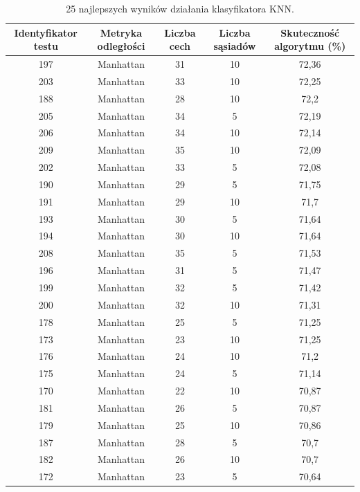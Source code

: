 \documentclass{article}
\begin{document}
\begin{center}
	\begin{longtable}{ |c|c|c|c|c| }
		\caption{25 najlepszych wyników działania klasyfikatora KNN.}
		\label{tab:srednie_wyniki}\\
		\hline
			Identyfikator testu & Metryka odległości & Liczba cech & Liczba sąsiadów & Skuteczność algorytmu (\%) \\
		\hline
            197 & Manhattan & 31 & 10 & 72,36\\
            203	& Manhattan & 33 & 10 & 72,25\\
            188	& Manhattan & 28 & 10 & 72,2\\
            205	& Manhattan & 34 & 5 & 72,19\\
            206	& Manhattan & 34 & 10 & 72,14\\
            209	& Manhattan & 35 & 10 & 72,09\\
            202 & Manhattan & 33 & 5 & 72,08\\
            190	& Manhattan & 29 & 5 & 71,75\\
            191	& Manhattan & 29 & 10 & 71,7\\
            193	& Manhattan & 30 & 5 & 71,64\\
            194	& Manhattan & 30 & 10 & 71,64\\
            208	& Manhattan & 35 & 5 & 71,53\\
            196	& Manhattan & 31 & 5 & 71,47\\
            199	& Manhattan & 32 & 5 & 71,42\\
            200	& Manhattan & 32 & 10 & 71,31\\
            178	& Manhattan & 25 & 5 & 71,25\\
            173	& Manhattan & 23 & 10 & 71,25\\
            176	& Manhattan & 24 & 10 & 71,2\\
            175	& Manhattan & 24 & 5 & 71,14\\
            170	& Manhattan & 22 & 10 & 70,87\\
            181	& Manhattan & 26 & 5 & 70,87\\
            179	& Manhattan & 25 & 10 & 70,86\\
            187	& Manhattan & 28 & 5 & 70,7\\
            182	& Manhattan & 26 & 10 & 70,7\\
            172	& Manhattan & 23 & 5 & 70,64\\
		\hline
	\end{longtable}
\end{center}
\end{document}
